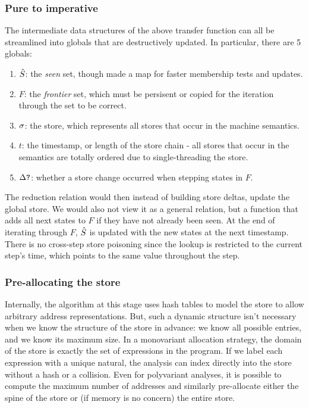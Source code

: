 \documentclass[9pt]{sigplanconf} %
\begin{document}
\subsubsection{Pure to imperative}

The intermediate data structures of the above transfer function can all be streamlined into globals that are destructively updated.
%
In particular, there are 5 globals:

\begin{enumerate}
\item{$\hat{S}$: the \emph{seen} set, though made a map for faster membership tests and updates.}
\item{$F$: the \emph{frontier} set, which must be persisent or copied for the iteration through the set to be correct.}
\item{$\sigma$: the store, which represents all stores that occur in the machine semantics.}
\item{$t$: the timestamp, or length of the store chain - all stores that occur in the semantics are totally ordered due to single-threading the store.}
\item{$\Delta\mbox{{\tt ?}}$: whether a store change occurred when stepping states in $F$.}
\end{enumerate}

The reduction relation would then instead of building store deltas, update the global store.
%
We would also not view it as a general relation, but a function that adds all next states to $F$ if they have
not already been seen.
%
At the end of iterating through $F$, $\hat{S}$ is updated with the new states at the next timestamp.
%
There is no cross-step store poisoning since the lookup is restricted to the current step's time, which points to the same value throughout the step.

\subsubsection{Pre-allocating the store}

Internally, the algorithm at this stage uses hash tables to model the store to allow arbitrary address representations.
%
But, such a dynamic structure isn't necessary when we know the structure of the store in advance: we know all possible entries, and we know its maximum size.
%
In a monovariant allocation strategy, the domain of the store is exactly the set of expressions in the program.
%
If we label each expression with a unique natural, the analysis can index directly into the store without a hash or a collision.
%
Even for polyvariant analyses, it is possible to compute the maximum number of addresses and similarly pre-allocate either the spine of the store or (if memory is no concern) the entire store.
\end{document}

